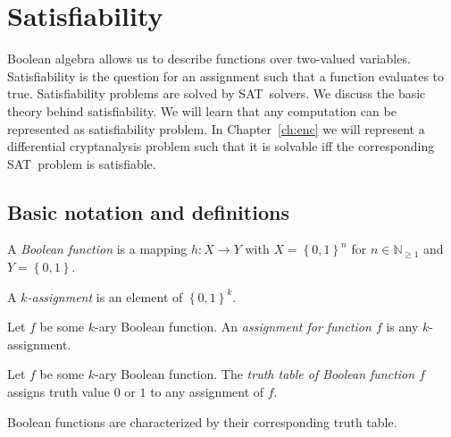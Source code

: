 \renewcommand*\chappic{img/satisfiability.pdf}
\renewcommand*\chapquote{What idiot called them logic errors rather than bool shit?}
\renewcommand*\chapquotesrc{Unknown}
\chapter{Satisfiability}
\label{ch:sat}
%
Boolean algebra allows us to describe functions over two-valued variables.
Satisfiability is the question for an assignment such that a function
evaluates to true. Satisfiability problems are solved by SAT~solvers.
We discuss the basic theory behind satisfiability. We will learn that any
computation can be represented as satisfiability problem. In Chapter~\ref{ch:enc}
we will represent a differential cryptanalysis problem such that it is
solvable iff the corresponding SAT~problem is satisfiable.

\section{Basic notation and definitions}
\label{sec:sat-intro}
%
\begin{defi}
  A \emph{Boolean function} is a mapping $h: X \to Y$ with $X = \left\{0,1\right\}^n$
  for $n \in \mathbb N_{\geq 1}$ and $Y = \left\{0,1\right\}$.
\end{defi}

\begin{defi}[Assignment]
  A \emph{$k$-assignment} is an element of $\left\{0,1\right\}^k$.

  \noindent
  Let $f$ be some $k$-ary Boolean function.
  An \emph{assignment for function $f$} is any $k$-assignment.
\end{defi}

\begin{defi}
  Let $f$ be some $k$-ary Boolean function.
  The \emph{truth table of Boolean function $f$} assigns
  truth value $0$ or $1$ to any assignment of $f$.
\end{defi}

Boolean functions are characterized by their corresponding truth table.

